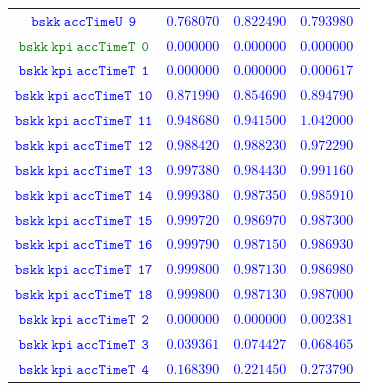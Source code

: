 \documentclass[10pt,a4paper]{article}
\begin{document}
\begin{table}[h!]
{\begin{tabular}{cccc}
\textcolor{blue}{$\mathtt{bskk~accTimeU~~9}$} & \textcolor{blue}{$0.768070$}& \textcolor{blue}{$0.822490$}& \textcolor{blue}{$0.793980$}\\
\textcolor{Green}{$\mathtt{bskk~kpi~accTimeT~~0}$} & \textcolor{blue}{$0.000000$}& \textcolor{blue}{$0.000000$}& \textcolor{blue}{$0.000000$}\\
\textcolor{blue}{$\mathtt{bskk~kpi~accTimeT~~1}$} & \textcolor{blue}{$0.000000$}& \textcolor{blue}{$0.000000$}& \textcolor{blue}{$0.000617$}\\
\textcolor{blue}{$\mathtt{bskk~kpi~accTimeT~~10}$} & \textcolor{blue}{$0.871990$}& \textcolor{blue}{$0.854690$}& \textcolor{blue}{$0.894790$}\\
\textcolor{blue}{$\mathtt{bskk~kpi~accTimeT~~11}$} & \textcolor{blue}{$0.948680$}& \textcolor{blue}{$0.941500$}& \textcolor{blue}{$1.042000$}\\
\textcolor{blue}{$\mathtt{bskk~kpi~accTimeT~~12}$} & \textcolor{blue}{$0.988420$}& \textcolor{blue}{$0.988230$}& \textcolor{blue}{$0.972290$}\\
\textcolor{blue}{$\mathtt{bskk~kpi~accTimeT~~13}$} & \textcolor{blue}{$0.997380$}& \textcolor{blue}{$0.984430$}& \textcolor{blue}{$0.991160$}\\
\textcolor{blue}{$\mathtt{bskk~kpi~accTimeT~~14}$} & \textcolor{blue}{$0.999380$}& \textcolor{blue}{$0.987350$}& \textcolor{blue}{$0.985910$}\\
\textcolor{blue}{$\mathtt{bskk~kpi~accTimeT~~15}$} & \textcolor{blue}{$0.999720$}& \textcolor{blue}{$0.986970$}& \textcolor{blue}{$0.987300$}\\
\textcolor{blue}{$\mathtt{bskk~kpi~accTimeT~~16}$} & \textcolor{blue}{$0.999790$}& \textcolor{blue}{$0.987150$}& \textcolor{blue}{$0.986930$}\\
\textcolor{blue}{$\mathtt{bskk~kpi~accTimeT~~17}$} & \textcolor{blue}{$0.999800$}& \textcolor{blue}{$0.987130$}& \textcolor{blue}{$0.986980$}\\
\textcolor{blue}{$\mathtt{bskk~kpi~accTimeT~~18}$} & \textcolor{blue}{$0.999800$}& \textcolor{blue}{$0.987130$}& \textcolor{blue}{$0.987000$}\\
\textcolor{blue}{$\mathtt{bskk~kpi~accTimeT~~2}$} & \textcolor{blue}{$0.000000$}& \textcolor{blue}{$0.000000$}& \textcolor{blue}{$0.002381$}\\
\textcolor{blue}{$\mathtt{bskk~kpi~accTimeT~~3}$} & \textcolor{blue}{$0.039361$}& \textcolor{blue}{$0.074427$}& \textcolor{blue}{$0.068465$}\\
\textcolor{blue}{$\mathtt{bskk~kpi~accTimeT~~4}$} & \textcolor{blue}{$0.168390$}& \textcolor{blue}{$0.221450$}& \textcolor{blue}{$0.273790$}\\

\end{tabular}}
\end{table}
\end{document}
